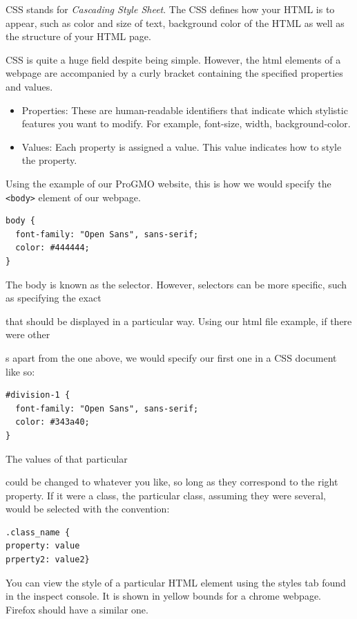 \documentclass[
]{book}
\theoremstyle{definition}
\theoremstyle{definition}
\theoremstyle{definition}
\theoremstyle{definition}
\theoremstyle{remark}
\begin{document}
CSS stands for \emph{Cascading Style Sheet}. The CSS defines how your HTML is to appear, such as color and size of text, background color of the HTML as well as the structure of your HTML page.

CSS is quite a huge field despite being simple. However, the html elements of a webpage are accompanied by a curly bracket containing the specified properties and values.

\begin{itemize}
\item
  Properties: These are human-readable identifiers that indicate which stylistic features you want to modify. For example, font-size, width, background-color.
\item
  Values: Each property is assigned a value. This value indicates how to style the property.
\end{itemize}

Using the example of our ProGMO website, this is how we would specify the \texttt{\textless{}body\textgreater{}} element of our webpage.

\begin{verbatim}
body {
  font-family: "Open Sans", sans-serif;
  color: #444444;
}
\end{verbatim}

The body is known as the selector. However, selectors can be more specific, such as specifying the exact

that should be displayed in a particular way. Using our html file example, if there were other

s apart from the one above, we would specify our first one in a CSS document like so:

\begin{verbatim}
#division-1 {
  font-family: "Open Sans", sans-serif;
  color: #343a40;
}
\end{verbatim}

The values of that particular

could be changed to whatever you like, so long as they correspond to the right property. If it were a class, the particular class, assuming they were several, would be selected with the convention:

\begin{verbatim}
.class_name {
property: value
prperty2: value2}
\end{verbatim}

You can view the style of a particular HTML element using the styles tab found in the inspect console. It is shown in yellow bounds for a chrome webpage. Firefox should have a similar one.
\end{document}
